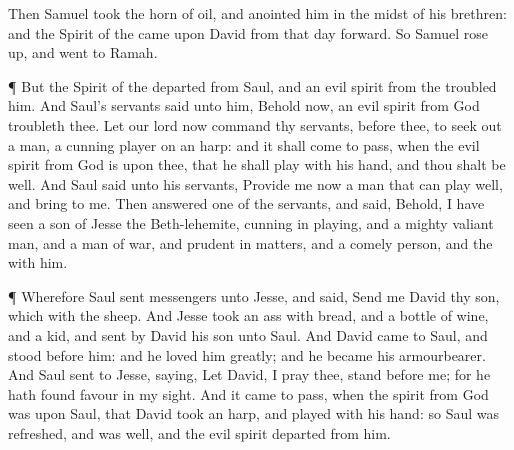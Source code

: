 {Then
Samuel
took the
horn of
oil, and
anointed him in the
midst of his
brethren: and the
Spirit of the
{}
came upon
David from that
day
forward. So
Samuel rose
up, and
went to
Ramah.
\par }{\PP {}¶ But the
Spirit of the
{}
departed from
Saul, and an
evil
spirit from the
{}
troubled him.
And
Saul’s
servants
said unto him, Behold now, an
evil
spirit from
God
troubleth thee.
Let our
lord now
command thy
servants,
{}
before thee, to seek
out a
man,
{} a
cunning
player on an
harp: and it shall come to pass, when the
evil
spirit from
God is upon thee, that he shall
play with his
hand, and thou shalt be
well.
And
Saul
said unto his
servants,
Provide me now a
man that can
play
well, and
bring
{} to me.
Then
answered
one of the
servants, and
said, Behold, I have
seen a
son of
Jesse the
Beth-lehemite,
{}
cunning in
playing, and a
mighty valiant
man, and a
man of
war, and
prudent in
matters, and a
comely
person, and the
{}
{} with him.
\par }{\PP {}¶ Wherefore
Saul
sent
messengers unto
Jesse, and
said,
Send me
David thy
son, which
{} with the
sheep.
And
Jesse
took an
ass
{} with
bread, and a
bottle of
wine, and
a
kid, and
sent
{}
by
David his
son unto
Saul.
And
David
came to
Saul, and
stood
before him: and he
loved him
greatly; and he became his
armourbearer.
And
Saul
sent to
Jesse,
saying, Let
David, I pray thee,
stand
before me; for he hath
found
favour in my
sight.
And it came to pass, when the
{}
spirit from
God was upon
Saul, that
David
took an
harp, and
played with his
hand: so
Saul was
refreshed, and was
well, and the
evil
spirit
departed from him.

}
